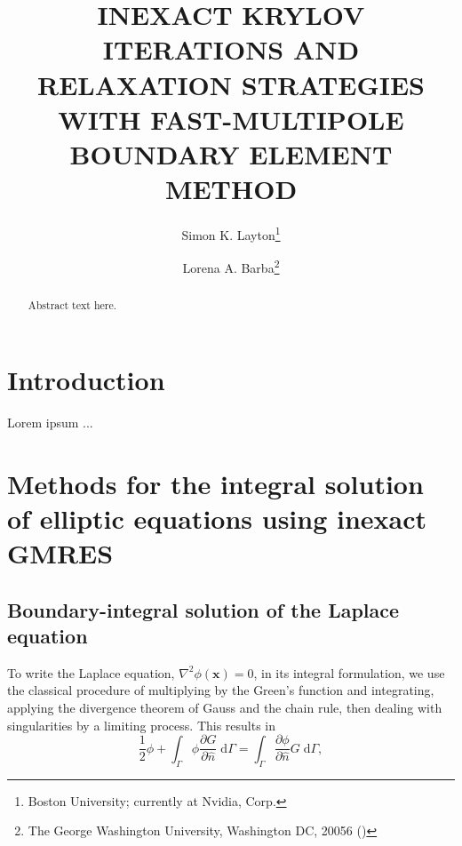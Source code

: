 \documentclass[final,leqno,]{siamltex1213}
\title{INEXACT KRYLOV ITERATIONS AND RELAXATION STRATEGIES WITH FAST-MULTIPOLE BOUNDARY ELEMENT METHOD}
\author{Simon K. Layton\thanks{Boston University; currently at Nvidia, Corp.}
\and Lorena A. Barba\thanks{The George Washington University, Washington DC, 20056 
(\email{labarba@gwu.edu})}}
\newcommand{\di}[1]{\text{d}#1}
\newcommand{\partiald}[2]{\frac{\partial #1}{\partial #2}}
\newcommand{\nhat}{\hat{n}}
\newcommand{\vect}[1]{\mathbf{#1}}
\begin{document}
\maketitle

\begin{abstract}
Abstract text here.
\end{abstract}

\begin{keywords}\end{keywords}

\begin{AMS}\end{AMS}


\pagestyle{myheadings}
\thispagestyle{plain}

\section{Introduction}

Lorem ipsum ...


\section{Methods for the integral solution of elliptic equations using inexact {\small GMRES}}

\subsection{Boundary-integral solution of the Laplace equation}

To write the Laplace equation, $\nabla^{2}\phi(\vect{x}) = 0$,  in its integral formulation, we use the classical procedure of multiplying by the Green's function and integrating, applying the divergence theorem of Gauss and the chain rule, then dealing with singularities by a limiting process. This results in
%
\begin{equation}\label{eqn:laplace_bem_final}
	\frac{1}{2}\phi + \int_{\Gamma} \phi\partiald{G}{\nhat}\;\di{\Gamma} = \int_{\Gamma}\partiald{\phi}{\nhat}G\;\di{\Gamma},
\end{equation}
\end{document}
